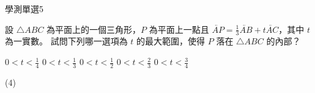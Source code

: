     \begin{QUESTION}
        \begin{ExamInfo}{93}{學測}{單選}{5}
        \end{ExamInfo}
        \begin{ExamAnsRateInfo}{61}{88}{62}{33}
        \end{ExamAnsRateInfo}
        \begin{QBODY}
            設 $\triangle ABC$ 為平面上的一個三角形，$P$ 為平面上一點且 $\lvec{AP}= \frac{1}{3}\lvec{AB}+ t\lvec{AC}$，其中 $t$為一實數。
            試問下列哪一選項為 $t$ 的最大範圍，使得 $P$ 落在 $\triangle ABC$ 的內部？ 
            \begin{QOPS} 
                \QOP $0<t < \frac{1}{4}$ 
                \QOP $0 < t < \frac{1}{3}$ 
                \QOP $0 < t <\frac{1}{2}$ 
                \QOP $0 < t < \frac{2}{3}$ 
                \QOP $0 < t < \frac{3}{4}$
            \end{QOPS}
        \end{QBODY}
        \begin{QFROMS}
        \end{QFROMS}
        \begin{QTAGS}\end{QTAGS}
        \begin{QANS}
            (4)
        \end{QANS}
        \begin{QSOLLIST}
        \end{QSOLLIST}
        \begin{QEMPTYSPACE}
        \end{QEMPTYSPACE}
    \end{QUESTION}
